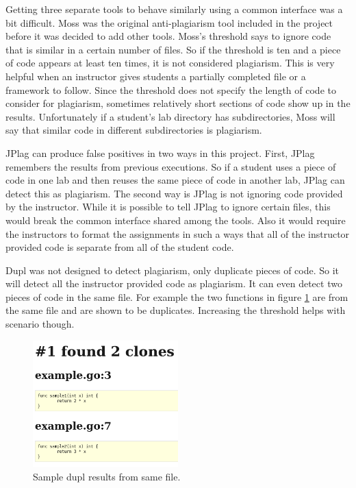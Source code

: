 \documentclass[10pt,journal,compsoc]{IEEEtran}
\begin{document}
	Getting three separate tools to behave similarly using a common interface was a bit difficult. Moss was the original anti-plagiarism tool included in the project before it was decided to add other tools. Moss's threshold says to ignore code that is similar in a certain number of files. So if the threshold is ten and a piece of code appears at least ten times, it is not considered plagiarism. This is very helpful when an instructor gives students a partially completed file or a framework to follow. Since the threshold does not specify the length of code to consider for plagiarism, sometimes relatively short sections of code show up in the results. Unfortunately if a student's lab directory has subdirectories, Moss will say that similar code in different subdirectories is plagiarism.
	
	JPlag can produce false positives in two ways in this project. First, JPlag remembers the results from previous executions. So if a student uses a piece of code in one lab and then reuses the same piece of code in another lab, JPlag can detect this as plagiarism. The second way is JPlag is not ignoring code provided by the instructor. While it is possible to tell JPlag to ignore certain files, this would break the common interface shared among the tools. Also it would require the instructors to format the assignments in such a ways that all of the instructor provided code is separate from all of the student code.
	
	Dupl was not designed to detect plagiarism, only duplicate pieces of code. So it will detect all the instructor provided code as plagiarism. It can even detect two pieces of code in the same file. For example the two functions in figure \ref{fig:duplSameFile} are from the same file and are shown to be duplicates. Increasing the threshold helps with scenario though.
	
	\begin{figure}[h!]
		\includegraphics[width=0.5\textwidth]{duplSameFile2.png}
		\caption{Sample dupl results from same file.}
		\label{fig:duplSameFile}
	\end{figure}
	
\end{document}
